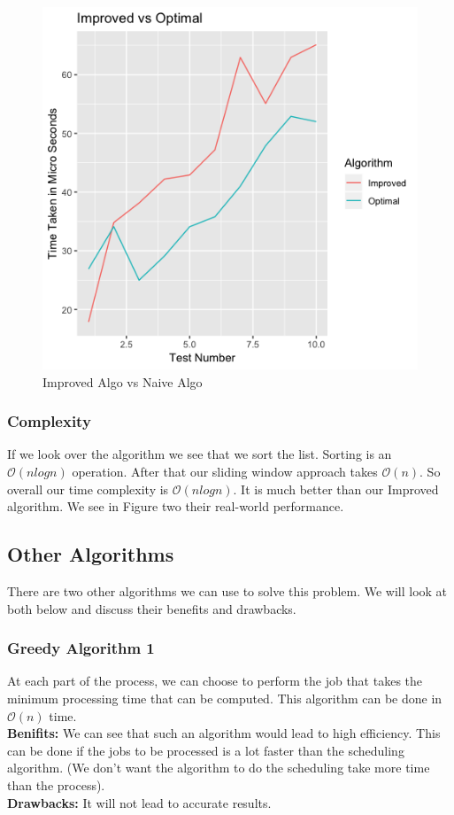 \documentclass[11pt]{article}
\begin{document}
{				
				\begin{figure}
					\includegraphics[scale=0.5]{ImprovedVsOptimal.png}
					\caption{Improved Algo vs Naive Algo}
				\end{figure}
				
				\subsubsection{Complexity}
				If we look over the algorithm we see that we sort the list. Sorting is an $\mathcal{O}(nlogn)$ operation.
				After that our sliding window approach takes $\mathcal{O}(n)$. So overall our time complexity is $\mathcal{O}(nlogn)$. It is much better than our Improved algorithm. We see in Figure two their real-world performance.
				
				\subsection{Other Algorithms}
				There are two other algorithms we can use to solve this problem. We will look at both below and discuss their benefits and drawbacks.
				
				\subsubsection{Greedy Algorithm 1}
				At each part of the process, we can choose to perform the job that takes the minimum processing time that can be computed. This algorithm can be done in $\mathcal{O}(n)$ time.\\
				\textbf{Benifits:} We can see that such an algorithm would lead to high efficiency. This can be done if the jobs to be processed is a lot faster than the scheduling algorithm. (We don't want the algorithm to do the scheduling take more time than the process).\\
				\textbf{Drawbacks:} It will not lead to accurate results.
				
}
\end{document}
